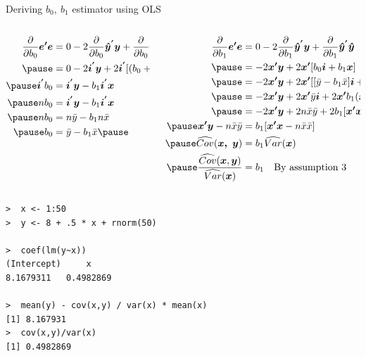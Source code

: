 \documentclass[aspectratio=169, handout]{beamer}
\numberwithin{equation}{section}
\begin{document}
\begin{frame}{Deriving $b_0,\ b_1$ estimator using OLS}
  \begin{columns}
  \begin{column}{.4\textwidth}
\begin{align*}
   \frac{\partial}{\partial b_0}\bm{e'}\bm{e}&=  0-2\frac{\partial}{\partial b_0}\bm{\hat{y}^{'}y}+\frac{\partial}{\partial b_0}\bm{\hat{y}^{'}}\bm{\hat{y}}\\\pause
  &= 0-2\bm{i^{'}}\bm{y}+2 \bm{i^{'}}[(b_0+b_1\bm{x})]\\\pause
  \bm{i^{'}}b_0 &=\bm{i^{'}}\bm{y}-b_1\bm{i^{'}}\bm{x}\\\pause
   nb_0 &=\bm{i^{'}}\bm{y}-b_1\bm{i^{'}}\bm{x}\\\pause
    nb_0 &= n\bar{y}-b_1n\bar{x}\\\pause
      b_0 &= \bar{y}-b_1\bar{x}\pause
    \end{align*}
\end{column}
  \begin{column}{.5\textwidth}
\begin{align*}
     \frac{\partial}{\partial b_1}\bm{e'}\bm{e}&= 0-2\frac{\partial}{\partial b_1}\bm{\hat{y}^{'}y}+\frac{\partial}{\partial b_1}\bm{\hat{y}^{'}}\bm{\hat{y}}\\\pause
  &= -2\bm{x'y}+2\bm{x'}[b_0\bm{i}+b_1\bm{x}]\\\pause
&= -2\bm{x'y}+2\bm{x'}[[\bar{y}-b_1\bar{x}]\bm{i}+b_1\bm{x}]\\\pause
&= -2\bm{x'y}+2\bm{x'}\bar{y}\bm{i}+2\bm{x' }b_1(\bm{x}-\bar{x}\bm{i})\\\pause
&= -2\bm{x'y}+2n\bar{x}\bar{y}+2b_1[\bm{x' x}-n\bar{x}\bar{x}]\\\pause
\bm{x'y}-n\bar{x}\bar{y}&=b_1[\bm{x' x}-n\bar{x}\bar{x}]\\\pause
\widehat{Cov}(\bm{x,\ y})&=b_1\widehat{Var}(\bm{x})\\\pause
\frac{\widehat{Cov}(\bm{x},\bm{y})}{\widehat{Var}(\bm{x})}&=b_1 \quad \text{By assumption 3}
\end{align*}
 \end{column}
 \end{columns}
\end{frame}



\begin{frame}[fragile]
  \begin{lstlisting}
>  x <- 1:50
>  y <- 8 + .5 * x + rnorm(50)

>  coef(lm(y~x))
(Intercept)     x 
8.1679311   0.4982869 

>  mean(y) - cov(x,y) / var(x) * mean(x)
[1] 8.167931
>  cov(x,y)/var(x)
[1] 0.4982869
   \end{lstlisting}
\end{frame}
\end{document}
